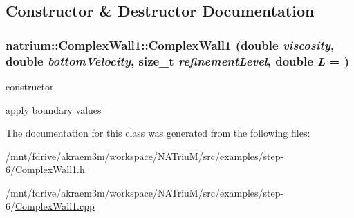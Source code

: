 \subsection{Constructor \& Destructor Documentation}
\hypertarget{classnatrium_1_1ComplexWall1_ad619c81f979a47c447fc0061bed20e05}{
\subsubsection[{ComplexWall1}]{\setlength{\rightskip}{0pt plus 5cm}natrium::ComplexWall1::ComplexWall1 (double {\em viscosity}, \/  double {\em bottomVelocity}, \/  size\_\-t {\em refinementLevel}, \/  double {\em L} = {})}}
\label{classnatrium_1_1ComplexWall1_ad619c81f979a47c447fc0061bed20e05}


constructor 

apply boundary values 

The documentation for this class was generated from the following files:\begin{DoxyCompactItemize}
\item 
/mnt/fdrive/akraem3m/workspace/NATriuM/src/examples/step-\/6/ComplexWall1.h\item 
/mnt/fdrive/akraem3m/workspace/NATriuM/src/examples/step-\/6/\hyperlink{ComplexWall1_8cpp}{ComplexWall1.cpp}\end{DoxyCompactItemize}

